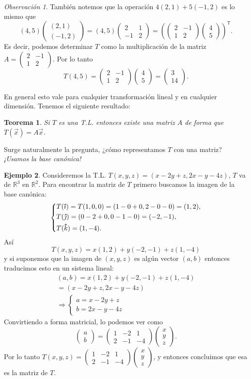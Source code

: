 \documentclass[12pt]{article}
\theoremstyle{plain}
\newtheorem{Th}{Teorema}  %
\theoremstyle{definition}
\newtheorem{Ex}[Th]{Ejemplo}           %
\theoremstyle{remark}
\newtheorem*{Rmk}{Observación}      %
\newcommand{\thickhat}[1]{\mathbf{\hat{\text{$#1$}}}}
\newcommand{\ii}{\vu{\imath}}
\newcommand{\jj}{\vu{\jmath}}
\newcommand{\kk}{\thickhat{k}}
\newcommand{\bR}{\mathbb{R}}        %
\newcommand{\sT}{\mathsf{T}}        %
\renewcommand{\:}{\colon}           %
\renewcommand{\.}{\Cdot}                %
\newcommand{\twobyone}[2]{\begin{pmatrix} %
  #1 \\ #2 \end{pmatrix}}
\newcommand{\twobytwo}[4]{\begin{pmatrix} %
    #1 & #2 \\ #3 & #4 \end{pmatrix}}
\newcommand{\twobythree}[6]{\begin{pmatrix} %
        #1 & #2 & #3\\ #4 & #5 & #6 \end{pmatrix}}
\newcommand{\threebyone}[3]{\begin{pmatrix} %
  #1 \\ #2 \\ #3 \end{pmatrix}}
\newcommand{\To}{\Rightarrow}
\begin{document}
\begin{multicols}{2}
\begin{Rmk}
    También notemos que la operación $4(2,1)+5(-1,2)$ es lo mismo que 
        $$(4,5)\twobyone{(2,1)}{(-1,2)}=(4,5)\twobytwo{2}{1}{-1}{2}=\left(\twobytwo{2}{-1}{1}{2}\twobyone{4}{5}\right)^\sT.$$
    Es decir, podemos determinar $T$ como la multiplicación de la matriz $A=\twobytwo{2}{-1}{1}{2}$. Por lo tanto 
    $$T(4,5)=\twobytwo{2}{-1}{1}{2}\twobyone{4}{5}=\twobyone{3}{14}.$$
\end{Rmk}

En general esto vale para cualquier transformación lineal y en cualquier dimensión. Tenemos el siguiente resultado:

\begin{Th}
Si $T$ es una T.L. entonces existe una matriz $A$ de forma que $T(\vec{x})=A\vec{x}$.
\end{Th}

Surge naturalmente la pregunta, ¿cómo representamos $T$ con una matriz? \emph{¡Usamos la base canónica!}

\begin{Ex}
    Consideremos la T.L. $T(x,y,z)=(x-2y+z,2x-y-4z)$, $T$ va de $\bR^3$ en $\bR^2$. Para encontrar la matriz de $T$ primero buscamos la imagen de la base canónica:
    $$
    \left\lbrace
    \begin{aligned}
        &T(\ii)=T(1,0,0)=(1-0+0,2-0-0)=(1,2),\\
        &T(\jj)=(0-2+0,0-1-0)=(-2,-1),\\
        &T(\kk)=(1,-4).
    \end{aligned}
    \right.
    $$
    Así 
    $$T(x,y,z)=x(1,2)+y(-2,-1)+z(1,-4)$$
    y si suponemos que la imagen de $(x,y,z)$ es algún vector $(a,b)$ entonces traducimos esto en un sistema lineal:
    \begin{gather*}
        (a,b)=x(1,2)+y(-2,-1)+z(1,-4)\\
        =(x-2y+z,2x-y-4z)\\
        \To \left\lbrace
        \begin{aligned}
            a=x-2y+z\\
            b=2x-y-4z
        \end{aligned}
        \right.
    \end{gather*}
    Convirtiendo a forma matricial, lo podemos ver como 
    $$\twobyone{a}{b}=\twobythree{1}{-2}{1}{2}{-1}{-4}\threebyone{x}{y}{z}.$$
    Por lo tanto $T(x,y,z)=\twobythree{1}{-2}{1}{2}{-1}{-4}\threebyone{x}{y}{z}$, y entonces concluimos que esa es la matriz de $T$.
\end{Ex}


\end{multicols}
\end{document}
